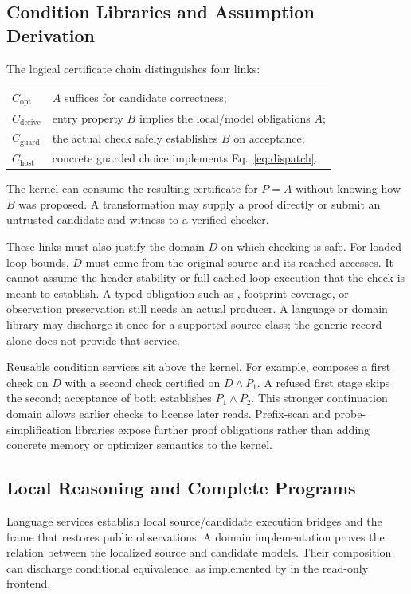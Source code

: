 \subsection{Condition Libraries and Assumption Derivation}

The logical certificate chain distinguishes four links:
\begin{center}
\begin{tabular}{ll}
$C_{\mathrm{opt}}$&$A$ suffices for candidate correctness;\\
$C_{\mathrm{derive}}$&entry property $B$ implies the local/model obligations $A$;\\
$C_{\mathrm{guard}}$&the actual check safely establishes $B$ on acceptance;\\
$C_{\mathrm{host}}$&concrete guarded choice implements Eq.~\eqref{eq:dispatch}.
\end{tabular}
\end{center}
The kernel can consume the resulting certificate for $P=A$ without knowing how
$B$ was proposed. A transformation may supply a proof directly or submit an
untrusted candidate and witness to a verified checker.

These links must also justify the domain $D$ on which checking is safe.
For loaded loop bounds, $D$ must come from the original source and its reached
accesses. It cannot assume the header stability or full cached-loop execution
that the check is meant to establish. A typed obligation such as
, footprint coverage, or observation preservation still needs an
actual producer. A language or domain library may discharge it once for a
supported source class; the generic record alone does not provide that service.

Reusable condition services sit above the kernel. For example,
 composes a first check on $D$ with a second
check certified on $D\land P_1$. A refused first stage skips the second;
acceptance of both establishes $P_1\land P_2$. This stronger continuation domain
allows earlier checks to license later reads. Prefix-scan and probe-simplification
libraries expose further proof obligations rather than adding concrete memory
or optimizer semantics to the kernel.

\subsection{Local Reasoning and Complete Programs}

Language services establish local source/candidate execution bridges and the
frame that restores public observations. A domain implementation proves the
relation between the localized source and candidate models. Their composition
can discharge conditional equivalence, as implemented by
 in the read-only frontend.

